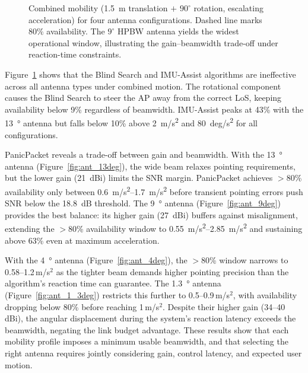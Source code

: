 \documentclass[fleqn,10pt]{wlscirep}
\newcommand{\legline}[2]{%
    \tikz[Blind Search=-0.5ex]{
        \draw[#1, #2, line width=1.5pt] (0,0) -- (0.5,0);
    }%
}
\begin{document}
\begin{figure}[ht!]
    
    \caption{Combined mobility (1.5~m translation $+$ $90^\circ$ rotation, escalating acceleration) for four antenna configurations. Dashed line marks 80\% availability. The $9^\circ$ HPBW antenna yields the widest operational window, illustrating the gain--beamwidth trade-off under reaction-time constraints.}
    \label{fig:antenna_comparison}
    \vspace{-5pt}
\end{figure}

Figure~\ref{fig:antenna_comparison} shows that the Blind Search and IMU-Assist algorithms are ineffective across all antenna types under combined motion. The rotational component causes the Blind Search to steer the AP away from the correct LoS, keeping availability below 9\% regardless of beamwidth. IMU-Assist peaks at 43\% with the \SI{13}{\degree} antenna but falls below 10\% above \SI{2}{m/s^2} and \SI{80}{deg/s^2} for all configurations.

PanicPacket reveals a trade-off between gain and beamwidth. With the \SI{13}{\degree} antenna (Figure~\ref{fig:ant_13deg}), the wide beam relaxes pointing requirements, but the lower gain (\SI{21}{dBi}) limits the SNR margin. PanicPacket achieves $>$80\% availability only between \SIrange{0.6}{1.7}{m/s^2} before transient pointing errors push SNR below the \SI{18.8}{dB} threshold. The \SI{9}{\degree} antenna (Figure~\ref{fig:ant_9deg}) provides the best balance: its higher gain (\SI{27}{dBi}) buffers against misalignment, extending the $>$80\% availability window to \SIrange{0.55}{2.85}{m/s^2} and sustaining above 63\% even at maximum acceleration.

With the \SI{4}{\degree} antenna (Figure~\ref{fig:ant_4deg}), the $>$80\% window narrows to 0.58--1.2\,m/s$^2$ as the tighter beam demands higher pointing precision than the algorithm's reaction time can guarantee. The \SI{1.3}{\degree} antenna (Figure~\ref{fig:ant_1_3deg}) restricts this further to 0.5--0.9\,m/s$^2$, with availability dropping below 80\% before reaching 1\,m/s$^2$. Despite their higher gain (34--40\,dBi), the angular displacement during the system's reaction latency exceeds the beamwidth, negating the link budget advantage. These results show that each mobility profile imposes a minimum usable beamwidth, and that selecting the right antenna requires jointly considering gain, control latency, and expected user motion.
\end{document}
